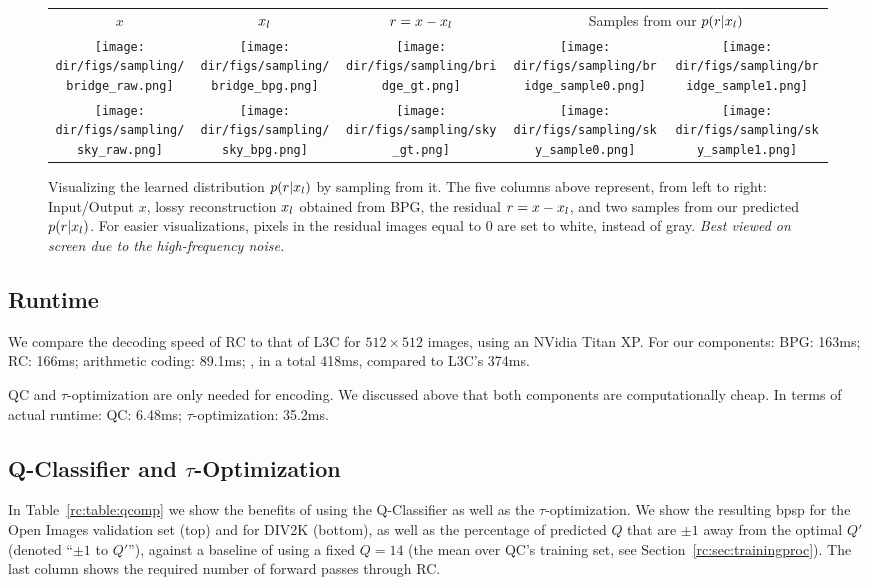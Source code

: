 \begin{figure*}[ht!]
\small
\begin{tabular}{@{}c@{\hskip 1pt}c@{\hskip 1pt}c@{\hskip 1.2em}c@{\hskip 1pt}c@{\hskip 1pt}}
%
$x$ & $x_l$ & $r = x - x_l$ & \multicolumn{2}{c}{Samples from our $p(r|x_l)$} \\
%
\texttt{[image: \\dir/figs/sampling/bridge\_raw.png]} &
\texttt{[image: \\dir/figs/sampling/bridge\_bpg.png]} &
\texttt{[image: \\dir/figs/sampling/bridge\_gt.png]} &
\texttt{[image: \\dir/figs/sampling/bridge\_sample0.png]} &
\texttt{[image: \\dir/figs/sampling/bridge\_sample1.png]} \\
\texttt{[image: \\dir/figs/sampling/sky\_raw.png]} &
\texttt{[image: \\dir/figs/sampling/sky\_bpg.png]} &
\texttt{[image: \\dir/figs/sampling/sky\_gt.png]} &
\texttt{[image: \\dir/figs/sampling/sky\_sample0.png]} &
\texttt{[image: \\dir/figs/sampling/sky\_sample1.png]} 
\end{tabular}
    \caption{\label{rc:fig:residuals}Visualizing the learned distribution $p(r|x_l)$ by sampling from it. The five columns above represent, from left to right:
Input/Output $x$, lossy reconstruction $x_l$ obtained from BPG, the residual $r = x - x_l$, and two samples from our predicted $p(r|x_l)$.
For easier visualizations, pixels in the residual images equal to 0 are set to white, instead of gray. \emph{Best viewed on screen due to the high-frequency noise.}}
\end{figure*}

\subsection{Runtime} \label{rc:sec:runtime}

We compare the decoding speed of RC to that of L3C for $512{\times}512$ images, using an NVidia Titan XP.
For our components: 
BPG: 163ms; RC: 166ms; arithmetic coding: 89.1ms; \ie, in a total 418ms, compared to L3C's 374ms.

QC and $\tau$-optimization are only needed for encoding. We discussed above that both components are computationally cheap. In terms of actual runtime: QC: 6.48ms; $\tau$-optimization: 35.2ms.


\subsection{Q-Classifier and $\tau$-Optimization}
In Table~\ref{rc:table:qcomp} we show the benefits of using the Q-Classifier as well as the $\tau$-optimization. We show the resulting bpsp for the Open Images validation set (top) and for DIV2K (bottom), as well as the percentage of predicted $Q$ that are $\pm1$ away from the optimal $Q'$ (denoted ``$\pm1$ to $Q'$''), against a baseline of using a fixed $Q=14$ (the mean over QC's training set, see Section~\ref{rc:sec:trainingproc}). 
The last column shows the required number of forward passes through RC.


